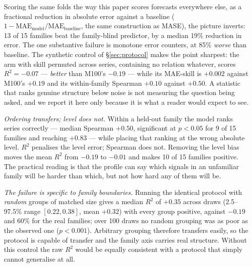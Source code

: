 \documentclass[11pt,a4paper]{article}
\newcommand{\num}[1]{#1}
\begin{document}
Scoring the same folds the way this paper scores forecasts everywhere else, as
a fractional reduction in absolute error against a baseline
(\(1-\mathrm{MAE}_{\text{model}}/\mathrm{MAE}_{\text{baseline}}\), the same
construction as MASE), the picture inverts: \num{13} of \num{15} families beat
the family-blind predictor, by a median \num{19}\% reduction in error. The one
substantive failure is monotone error counters, at \num{85}\% \emph{worse} than
baseline. The synthetic control of \S\ref{sec:protocol} makes the point sharpest:
the arm with skill permuted across series, containing no relation whatever,
scores \(R^2=-0.07\) --- \emph{better} than M100's \(-0.19\) --- while its
MAE-skill is \(+0.002\) against M100's \(+0.19\) and its within-family Spearman
\(+0.10\) against \(+0.50\). A statistic that ranks genuine structure below
noise is not measuring the question being asked, and we report it here only
because it is what a reader would expect to see.

\emph{Ordering transfers; level does not.} Within a held-out family the model
ranks series correctly --- median Spearman \(+0.50\), significant at
\(p<0.05\) for \num{9} of \num{15} families and reaching \(+0.83\) --- while
placing that ranking at the wrong absolute level. \(R^2\) penalises the level
error; Spearman does not. Removing the level bias moves the mean \(R^2\) from
\(-0.19\) to \(-0.01\) and makes \num{10} of \num{15} families positive. The
practical reading is that the profile can say which signals in an unfamiliar
family will be harder than which, but not how hard any of them will be.

\emph{The failure is specific to family boundaries.} Running the identical
protocol with \emph{random} groups of matched size gives a median \(R^2\) of
\(+0.35\) across draws (2.5--97.5\% range \([0.22, 0.38]\), mean \(+0.32\))
with every group positive,
against \(-0.19\) and \num{60}\% for the real families; over \num{100} draws
no random grouping was as poor as the observed one (\(p<0.001\)). Arbitrary
grouping therefore transfers easily, so the protocol is capable of transfer and
the family axis carries real structure. Without this control the raw \(R^2\)
would be equally consistent with a protocol that simply cannot generalise at
all.
\end{document}
